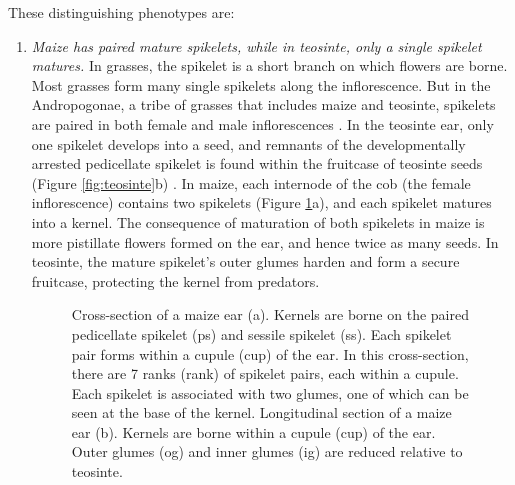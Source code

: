 \documentclass[9pt,twocolumn,twoside]{rilabRxiv}
\begin{document}
\noindent These distinguishing phenotypes are:

\begin{enumerate}

 \item \textit{Maize has paired mature spikelets, while in teosinte, only a single spikelet matures.}
 In grasses, the spikelet is a short branch on which flowers are borne.
 Most grasses form many single spikelets along the inflorescence.
 But in the Andropogonae, a tribe of grasses that includes maize and teosinte, spikelets are paired in both female and male inflorescences \citep{kellogg2000, wu2009}.
In the teosinte ear, only one spikelet develops into a seed, and remnants of the developmentally arrested pedicellate spikelet is found within the fruitcase of teosinte seeds (Figure \ref{fig:teosinte}b) \citep{weatherwax1935, sundberg1990, doebley1995sos1}.
 In maize, each internode of the cob (the female inflorescence) contains two spikelets (Figure \ref{fig:maize}a), and each spikelet matures into a kernel.
 The consequence of maturation of both spikelets in maize is more pistillate flowers formed on the ear, and hence twice as many seeds.
 In teosinte, the mature spikelet's outer glumes harden and form a secure fruitcase, protecting the  kernel from predators.

   \begin{figure}
        \caption{\label{fig:maize} Cross-section of a maize ear (a). Kernels are borne on the paired pedicellate spikelet (ps) and sessile spikelet (ss). Each spikelet pair forms within a cupule (cup) of the ear.
In this cross-section, there are 7 ranks (rank) of spikelet pairs, each within a cupule. Each spikelet is associated with two glumes, one of which can be seen at the base of the kernel.
Longitudinal section of a maize ear (b). Kernels are borne within a cupule (cup) of the ear. Outer glumes (og) and inner glumes (ig) are reduced relative to teosinte.}
    \end{figure}



\end{enumerate}
\end{document}
